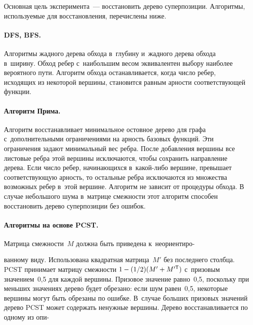 \begin{multicols}{2}
\vspace*{-3pt}

Основная цель эксперимента~--- восстановить дерево суперпозиции. Алгоритмы, 
используемые для восстановления, перечислены ниже.

\vspace*{-14pt}

\paragraph*{DFS, BFS.}
Алгоритмы жадного дерева обхода в~глубину и~жадного дерева обхода в~ширину. 
Обход ребер с~наибольшим весом эквивалентен выбору наиболее вероятного пути. 
Алгоритм обхода останавливается, когда число ребер, исходящих из некоторой 
вершины, становится равным арности соответствующей функции.

\vspace*{-14pt}

\paragraph*{Алгоритм Прима.}
Алгоритм восстанавливает минимальное остовное дерево для графа с~дополнительными 
ограничениями на арность базовых функций. Эти ограничения задают минимальный вес 
ребра. После добавления вершины все лис\-то\-вые ребра этой вершины исключаются, 
чтобы сохранить направление дерева. Если число ребер, начинающихся в~какой-либо 
вершине, превышает соответствующую арность, то остальные ребра исключаются из 
множества возможных ребер в~этой вершине. Алгоритм не зависит от процедуры 
обхода. В случае небольшого шума в~матрице смежности этот алгоритм способен 
восстановить дерево суперпозиции без ошибок. 


\vspace*{-14pt}

\paragraph*{Алгоритмы на основе PCST.}
Матрица смеж\-ности~$M$ должна быть приведена к~неориентиро-\linebreak\vspace*{-12pt}

\pagebreak

\noindent
ванному виду. 
Использована квад\-рат\-ная мат\-ри\-ца~$M'$ без последнего столбца. PCST 
принимает мат\-ри\-цу смеж\-ности $1 \hm- ({1}/{2})(M' \hm+ M'^{\mathsf{T}})$ с~призовым 
значением~0,5 для каж\-дой вершины.
Призовое значение рав\-но~0,5, поскольку при меньших значениях дерево будет 
обрезано: если шум равен~0,5, некоторые вершины могут быть обрезаны по ошибке. 
В~случае больших призовых значений
дерево PCST может содержать ненужные 
вершины. Дерево восстанавливается по одному из опи-\linebreak\vspace*{-12pt}


\end{multicols}
